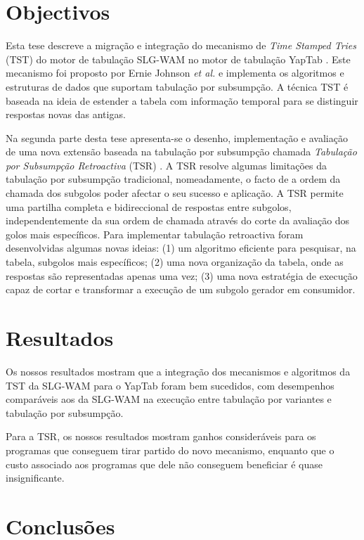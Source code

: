 \documentclass[9pt,a4paper]{extarticle}
\begin{document}
\begin{multicols}{2}
\section{Objectivos}

Esta tese descreve a migração e integração do mecanismo de \emph{Time Stamped Tries} (TST) do motor de tabulação
SLG-WAM \cite{Sagonas-PhD} no motor de tabulação YapTab \cite{Rocha-00a}. Este mecanismo foi proposto
por Ernie Johnson \textit{et al.} \cite{Johnson-99,Johnson-00} e implementa os algoritmos e estruturas
de dados que suportam tabulação por subsumpção. A técnica TST é baseada na ideia de estender a tabela com
informação temporal para se distinguir respostas novas das antigas.

Na segunda parte desta tese apresenta-se o desenho, implementação e avaliação de uma nova extensão baseada na tabulação
por subsumpção chamada \emph{Tabulação por Subsumpção Retroactiva} (TSR) \cite{cruz-jelia10}. A TSR resolve algumas limitações da
tabulação por subsumpção tradicional, nomeadamente, o facto de a ordem da chamada dos subgolos poder afectar o seu sucesso e
aplicação. A TSR permite uma partilha completa e bidireccional de respostas entre subgolos, independentemente da
sua ordem de chamada através do corte da avaliação dos golos mais específicos.
Para implementar tabulação retroactiva foram desenvolvidas algumas novas ideias: (1) um
algoritmo eficiente para pesquisar, na tabela, subgolos mais específicos; (2) uma nova organização da tabela,
onde as respostas são representadas apenas uma vez; (3) uma nova estratégia de execução capaz de cortar
e transformar a execução de um subgolo gerador em consumidor.
   
\section{Resultados}

Os nossos resultados mostram que a integração dos mecanismos e algoritmos da TST da SLG-WAM para o YapTab
foram bem sucedidos, com desempenhos comparáveis aos da SLG-WAM na execução entre tabulação por variantes e
tabulação por subsumpção.

Para a TSR, os nossos resultados mostram ganhos consideráveis para os programas que conseguem tirar
partido do novo mecanismo, enquanto que o custo associado aos programas que dele não conseguem beneficiar
é quase insignificante.
   
\section{Conclusões}


\end{multicols}
\end{document}
